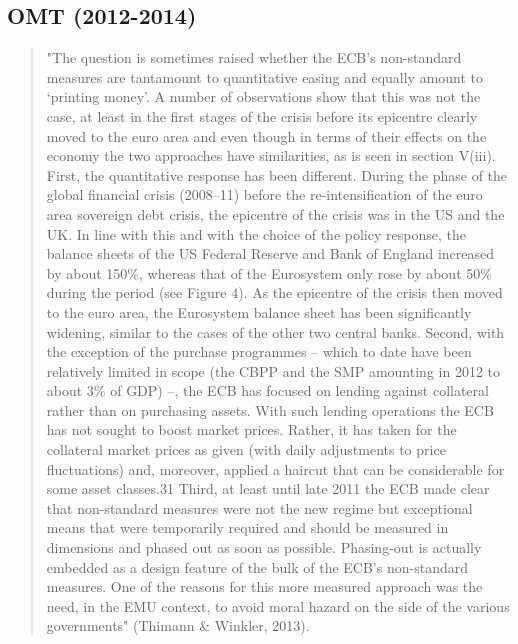 \subsection{OMT (2012-2014)}
\begin{quote}
"The question is sometimes raised whether the ECB’s non-standard measures are tantamount to quantitative easing and equally amount to ‘printing money’. A number of observations show that this was not the case, at least in the first stages of the crisis before its epicentre clearly moved to the euro area and even though in terms of their effects on the economy the two approaches have similarities, as is seen in section V(iii). First, the quantitative response has been different. During the phase of the global financial crisis (2008–11) before the re-intensification of the euro area sovereign debt crisis, the epicentre of the crisis was in the US and the UK. In line with this and with the choice of the policy response, the balance sheets of the US Federal Reserve and Bank of England increased by about 150\%, whereas that of the Eurosystem only rose by about 50\% during the period (see Figure 4). As the epicentre of the crisis then moved to the euro area, the Eurosystem balance sheet has been significantly widening, similar to the cases of the other two central banks. Second, with the exception of the purchase programmes – which to date have been relatively limited in scope (the CBPP and the SMP amounting in 2012 to about 3\% of GDP) –, the ECB has focused on lending against collateral rather than on purchasing assets. With such lending operations the ECB has not sought to boost market prices. Rather, it has taken for the collateral market prices as given (with daily adjustments to price fluctuations) and, moreover, applied a haircut that can be considerable for some asset classes.31 Third, at least until late 2011 the ECB made clear that non-standard measures were not the new regime but exceptional means that were temporarily required and should be measured in dimensions and phased out as soon as possible. Phasing-out is actually embedded as a design feature of the bulk of the ECB’s non-standard measures. One of the reasons for this more measured approach was the need, in the EMU context, to avoid moral hazard on the side of the various governments" (Thimann & Winkler, 2013).
\end{quote}
